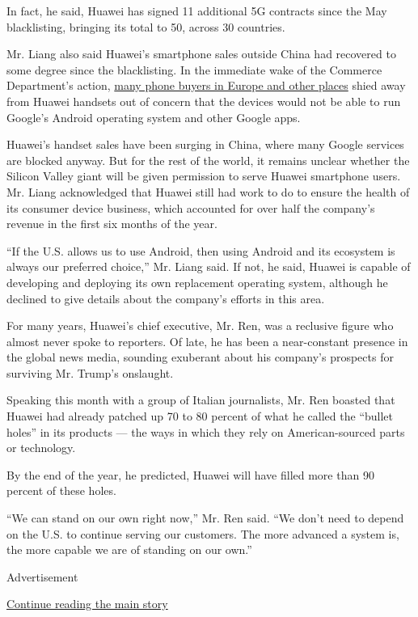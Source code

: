 In fact, he said, Huawei has signed 11 additional 5G contracts since the
May blacklisting, bringing its total to 50, across 30 countries.

Mr. Liang also said Huawei's smartphone sales outside China had
recovered to some degree since the blacklisting. In the immediate wake
of the Commerce Department's action,
\href{https://www.nytimes.com/2019/05/24/business/huawei-us-china-europe-.html}{many
phone buyers in Europe and other places} shied away from Huawei handsets
out of concern that the devices would not be able to run Google's
Android operating system and other Google apps.

Huawei's handset sales have been surging in China, where many Google
services are blocked anyway. But for the rest of the world, it remains
unclear whether the Silicon Valley giant will be given permission to
serve Huawei smartphone users. Mr. Liang acknowledged that Huawei still
had work to do to ensure the health of its consumer device business,
which accounted for over half the company's revenue in the first six
months of the year.

``If the U.S. allows us to use Android, then using Android and its
ecosystem is always our preferred choice,'' Mr. Liang said. If not, he
said, Huawei is capable of developing and deploying its own replacement
operating system, although he declined to give details about the
company's efforts in this area.

For many years, Huawei's chief executive, Mr. Ren, was a reclusive
figure who almost never spoke to reporters. Of late, he has been a
near-constant presence in the global news media, sounding exuberant
about his company's prospects for surviving Mr. Trump's onslaught.

Speaking this month with a group of Italian journalists, Mr. Ren boasted
that Huawei had already patched up 70 to 80 percent of what he called
the ``bullet holes'' in its products --- the ways in which they rely on
American-sourced parts or technology.

By the end of the year, he predicted, Huawei will have filled more than
90 percent of these holes.

``We can stand on our own right now,'' Mr. Ren said. ``We don't need to
depend on the U.S. to continue serving our customers. The more advanced
a system is, the more capable we are of standing on our own.''

Advertisement

\protect\hyperlink{after-bottom}{Continue reading the main story}

